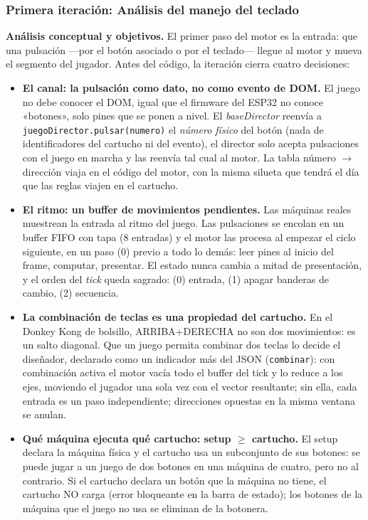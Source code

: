 \subsubsection{Primera iteración: Análisis del manejo del teclado}

\textbf{Análisis conceptual y objetivos.} El primer paso del motor es la
entrada: que una pulsación —por el botón asociado o por el teclado—
llegue al motor y mueva el segmento del jugador. Antes del código, la
iteración cierra cuatro decisiones:

\begin{itemize}
	\item \textbf{El canal: la pulsación como dato, no como evento de DOM.}
	El juego no debe conocer el DOM, igual que el firmware del ESP32 no
	conoce «botones», solo pines que se ponen a nivel. El \emph{baseDirector}
	reenvía a \texttt{juegoDirector.pulsar(numero)} el \emph{número físico}
	del botón (nada de identificadores del cartucho ni del evento), el
	director solo acepta pulsaciones con el juego en marcha y las reenvía
	tal cual al motor. La tabla número $\rightarrow$ dirección viaja en el
	código del motor, con la misma silueta que tendrá el día que las reglas
	viajen en el cartucho.
	\item \textbf{El ritmo: un buffer de movimientos pendientes.} Las
	máquinas reales muestrean la entrada al ritmo del juego. Las
	pulsaciones se encolan en un buffer FIFO con tapa (8 entradas) y el
	motor las procesa al empezar el ciclo siguiente, en un paso (0) previo
	a todo lo demás: leer pines al inicio del frame, computar, presentar.
	El estado nunca cambia a mitad de presentación, y el orden del
	\textit{tick} queda sagrado: (0) entrada, (1) apagar banderas de
	cambio, (2) secuencia.
	\item \textbf{La combinación de teclas es una propiedad del cartucho.}
	En el Donkey Kong de bolsillo, ARRIBA+DERECHA no son dos movimientos:
	es un salto diagonal. Que un juego permita combinar dos teclas lo
	decide el diseñador, declarado como un indicador más del JSON
	(\texttt{combinar}): con combinación activa el motor vacía todo el
	buffer del tick y lo reduce a los ejes, moviendo el jugador una sola
	vez con el vector resultante; sin ella, cada entrada es un paso
	independiente; direcciones opuestas en la misma ventana se anulan.
	\item \textbf{Qué máquina ejecuta qué cartucho: setup $\geq$ cartucho.}
	El setup declara la máquina física y el cartucho usa un subconjunto de
	sus botones: se puede jugar a un juego de dos botones en una máquina de
	cuatro, pero no al contrario. Si el cartucho declara un botón que la
	máquina no tiene, el cartucho NO carga (error bloqueante en la barra
	de estado); los botones de la máquina que el juego no usa se eliminan
	de la botonera.
\end{itemize}

